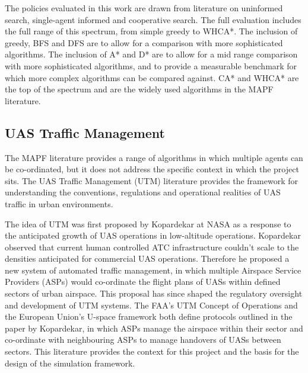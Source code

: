 \vspace{1em}

The policies evaluated in this work are drawn from literature on uninformed search, single-agent informed and cooperative search. The full evaluation includes the full range of this spectrum, from simple greedy to WHCA*. The inclusion of greedy, BFS and DFS are to allow for a comparison with more sophisticated algorithms. The inclusion of A* and D* are to allow for a mid range comparison with more sophisticated algorithms, and to provide a measurable benchmark for which more complex algorithms can be compared against. CA* and WHCA* are the top of the spectrum and are the widely used algorithms in the MAPF literature.\par

\vspace{1em}

\subsection{UAS Traffic Management}
\label{sec:utm}

The MAPF literature provides a range of algorithms in which multiple agents can be co-ordinated, but it does not address the specific context in which the project sits. The UAS Traffic Management (UTM) literature provides the framework for understanding the conventions, regulations and operational realities of UAS traffic in urban environments. \par

\vspace{1em}

The idea of UTM was first proposed by Kopardekar at NASA \cite{kopardekar2014utm} as a response to the anticipated growth of UAS operations in low-altitude operations. Kopardekar observed that current human controlled ATC infrastructure couldn't scale to the densities anticipated for commercial UAS operations. Therefore he proposed a new system of automated traffic management, in which multiple Airspace Service Providers (ASPs) would co-ordinate the flight plans of UASs within defined sectors of urban airspace. This proposal has since shaped the regulatory oversight and development of UTM systems. The FAA's UTM Concept of Operations \cite{faa2020utmconops} and the European Union's U-space framework \cite{easa2025anra} both define protocols outlined in the paper by Kopardekar, in which ASPs manage the airspace within their sector and co-ordinate with neighbouring ASPs to manage handovers of UASs between sectors. This literature provides the context for this project and the basis for the design of the simulation framework. \par

